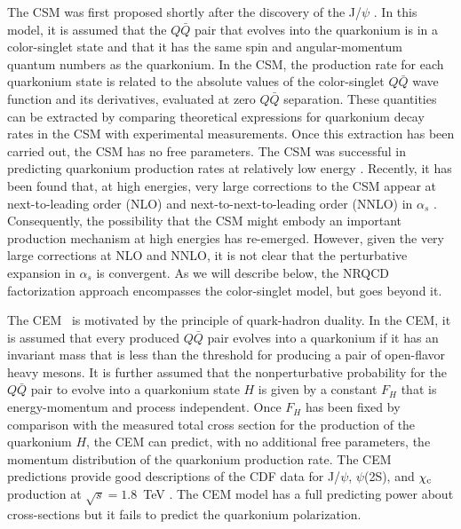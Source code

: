 \documentclass[aps,prc,preprint,superscriptaddress,showpacs,showkeys,amsmath]{revtex4-1}
\begin{document}
The CSM was first proposed shortly after the discovery of the J/$\psi$
\cite{Einhorn:1975ua,Ellis:1976fj,Carlson:1976cd,Berger:1980ni}.
In this model, it is assumed that the $Q\bar Q$ pair that evolves into
the quarkonium is in a color-singlet state and that it has the same spin
and angular-momentum quantum numbers as the quarkonium. In the CSM, the
production rate for each quarkonium state is related to the absolute
values of the color-singlet $Q\bar Q$ wave function and its derivatives,
evaluated at zero $Q\bar Q$ separation. These quantities can be
extracted by comparing theoretical expressions for quarkonium decay
rates in the CSM with experimental measurements. Once this extraction
has been carried out, the CSM has no free parameters. The CSM was
successful in predicting quarkonium production rates at relatively low
energy \cite{Schuler:1994hy}. Recently, it has been found that, at high
energies, very large corrections to the CSM appear at next-to-leading
order (NLO) and next-to-next-to-leading order (NNLO) in $\alpha_s$
\cite{Artoisenet:2007xi,Campbell:2007ws,Artoisenet:2008fc}.
Consequently, the possibility that the CSM might embody an important 
production mechanism at high energies has re-emerged. 
However, given the very large corrections at
NLO and NNLO, it is not clear that the perturbative expansion in
$\alpha_s$ is convergent. 
As we will describe below, the NRQCD factorization approach encompasses
the color-singlet model, but goes beyond it.

The CEM~\cite{Fritzsch:1977ay,Amundson:1995em,Amundson:1996qr}
is motivated by the principle of quark-hadron duality. In the CEM, it
is assumed that every produced $Q\bar Q$ pair evolves into a quarkonium
if it has an invariant mass that is less than the threshold for
producing a pair of open-flavor heavy mesons. It is further assumed that
the nonperturbative probability for the $Q\bar Q$ pair to evolve into a
quarkonium state $H$ is given by a constant $F_H$ that is
energy-momentum and process independent. Once $F_H$ has been fixed by
comparison with the measured total cross section for the production of
the quarkonium $H$, the CEM can predict, with no additional free
parameters, the momentum distribution of the quarkonium production rate. The
CEM predictions provide good descriptions of the CDF data for J/$\psi$,
$\psi$(2S), and $\chi_{\rm c}$ production at $\sqrt{s}=1.8$~TeV
\cite{Amundson:1996qr}. The CEM model has a full predicting power about 
cross-sections but it fails to predict the quarkonium polarization.
\end{document}
